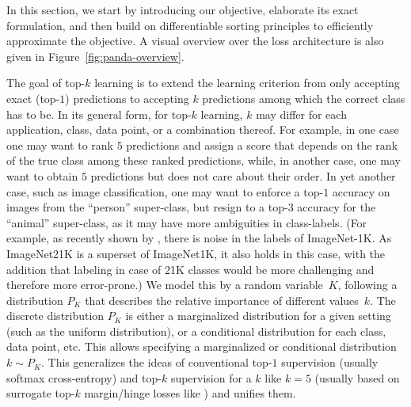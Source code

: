 \documentclass{article}
\begin{document}
In this section, we start by introducing our objective, elaborate its exact formulation, and then build on differentiable sorting principles to efficiently approximate the objective.
A visual overview over the loss architecture is also given in Figure~\ref{fig:panda-overview}.

The goal of top-$k$ learning is to extend the learning criterion from only accepting exact (top-$1$) predictions to accepting $k$ predictions among which the correct class has to be.
In its general form, for top-$k$ learning, $k$ may differ for each application, class, data point, or a combination thereof. 
For example, in one case one may want to rank $5$ predictions and assign a score that depends on the rank of the true class among these ranked predictions, while, in another case, one may want to obtain $5$ predictions but does not care about their order.
In yet another case, such as image classification, one may want to enforce a top-$1$ accuracy on images from the ``person'' super-class, but resign to a top-$3$ accuracy for the ``animal'' super-class, as it may have more ambiguities in class-labels.
(For example, as recently shown by \citet{northcutt2021pervasive}, there is noise in the labels of ImageNet-1K. 
As ImageNet21K is a superset of ImageNet1K, it also holds in this case, with the addition that labeling in case of 21K classes would be more challenging and therefore more error-prone.)
We model this by a random variable~$K$, following a distribution $P_K$ that describes the relative importance of different values~$k$. 
The discrete distribution $P_K$ is either a marginalized distribution for a given setting (such as the uniform distribution), or a conditional distribution for each class, data point, etc. 
This allows specifying a marginalized or conditional distribution $k\sim P_K$. 
This generalizes the ideas of conventional top-$1$ supervision (usually softmax cross-entropy) and top-$k$ supervision for a $k$ like $k=5$ (usually based on surrogate top-$k$ margin/hinge losses like \citep{lapin2016loss, berrada2018smooth}) and unifies them.
\end{document}
